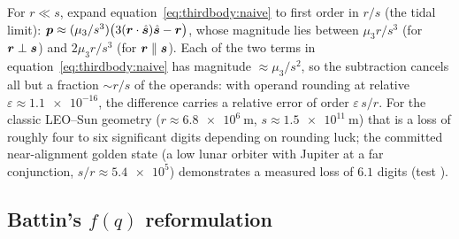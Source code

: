 For $r \ll s$, expand equation~\eqref{eq:thirdbody:naive} to first order
in $r/s$ (the tidal limit):
$\bm{p} \approx (\mu_3/s^{3})\bigl(3 (\bm{r} \cdot \hat{\bm{s}})
\hat{\bm{s}} - \bm{r}\bigr)$, whose magnitude lies between $\mu_3 r /
s^{3}$ (for $\bm{r} \perp \bm{s}$) and $2 \mu_3 r / s^{3}$ (for $\bm{r}
\parallel \bm{s}$). Each of the two terms in
equation~\eqref{eq:thirdbody:naive} has magnitude $\approx \mu_3 /
s^{2}$, so the subtraction cancels all but a fraction $\sim r/s$ of the
operands: with operand rounding at relative $\varepsilon \approx
\num{1.1e-16}$, the difference carries a relative error of order
$\varepsilon \, s / r$. For the classic LEO--Sun geometry ($r \approx
\qty{6.8e6}{\metre}$, $s \approx \qty{1.5e11}{\metre}$) that is a loss of
roughly four to six significant digits depending on rounding luck; the
committed near-alignment golden state (a low lunar orbiter with Jupiter
at a far conjunction, $s/r \approx \num{5.4e5}$) demonstrates a measured
loss of $6.1$ digits (test
).

\subsection{Battin's \texorpdfstring{$f(q)$}{f(q)} reformulation}

